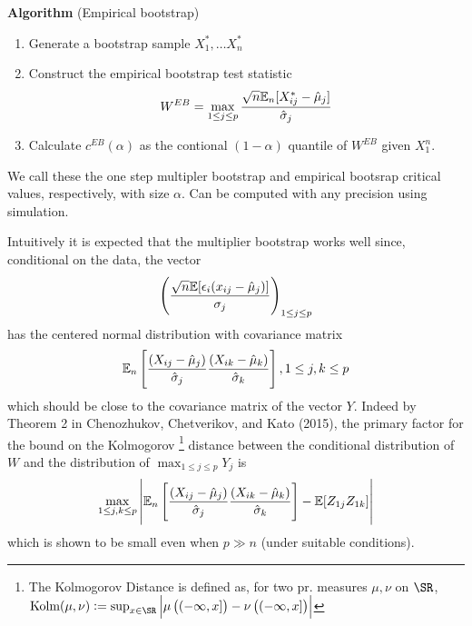 \textbf{Algorithm} (Empirical bootstrap)
\begin{enumerate}
	\item Generate a bootstrap sample $X_1^*, \dots X_n^*$
	\item Construct the empirical bootstrap test statistic 
	\begin{equation}
		\label{eq:CCK-31}
		W^{EB} = \max_{1\leq j \leq p} \frac{\sqrt{n}\mathbb{E}_n[X_{ij}^* - \hat{\mu}_j]}{\hat{\sigma}_j}
	\end{equation}
	\item Calculate $c^{EB}(\alpha)$ as the contional $(1-\alpha)$ quantile of $W^{EB}$ given $X_1^n$.
\end{enumerate}
We call these the one step multipler bootstrap and empirical bootsrap critical values, respectively, with size $\alpha$. Can be computed with any precision using simulation. 

Intuitively it is expected that the multiplier bootstrap works well since, conditional on the data, the vector 
\[\left(\frac{\sqrt{n}\mathbb{E}[\epsilon_i(x_{ij} - \hat{\mu}_j)]}{\sigma_j}\right)_{1\leq j \leq p}\]
has the centered normal distribution with covariance matrix 
\begin{equation}
	\label{eq:2.34}
	\mathbb{E}_n\left[\frac{(X_{ij} - \hat{\mu}_j)}{\hat{\sigma}_j}\frac{(X_{ik} - \hat{\mu}_k)}{\hat{\sigma}_k}\right], 1 \leq j, k\leq p
\end{equation}
which should be close to the covariance matrix of the vector $Y$. Indeed by Theorem 2 in Chenozhukov, Chetverikov, and Kato (2015), the primary factor for the bound on the Kolmogorov
\footnote{The Kolmogorov Distance is defined as, for two pr. measures $\mu,\nu$ on $\SR$, $\text{Kolm}(\mu,\nu) := \sup_{x\in \SR}\left|\mu\left((-\infty, x]\right) - \nu\left((-\infty, x]\right)   \right|$}
distance between the conditional distribution of $W$ and the distribution of $\max_{1\leq j \leq p} Y_j$ is 
\[\max_{1\leq j, k \leq p} \left|\mathbb{E}_n\left[\frac{(X_{ij} - \hat{\mu}_j)}{\hat{\sigma}_j}\frac{(X_{ik} - \hat{\mu}_k)}{\hat{\sigma}_k}\right] - \mathbb{E}[Z_{1j}Z_{1k}] \right|\]
which is shown to be small even when $p \gg n$ (under suitable conditions).

